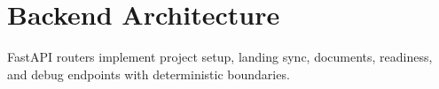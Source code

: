 \section{Backend Architecture}
FastAPI routers implement project setup, landing sync, documents, readiness, and debug endpoints with deterministic boundaries.

